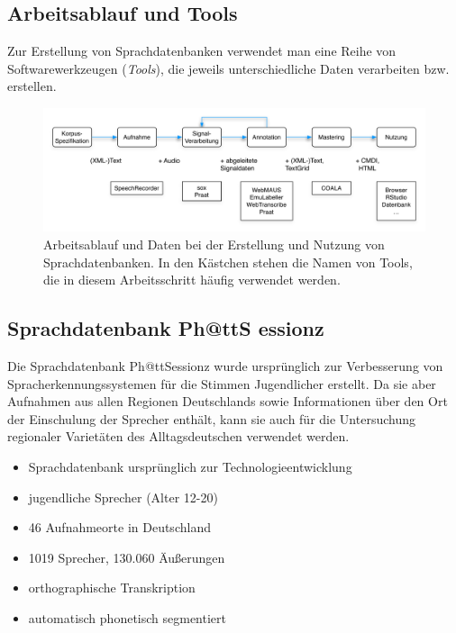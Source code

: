 \documentclass[11pt]{book}
\begin{document}
\subsection*{Arbeitsablauf und Tools}
Zur Erstellung von Sprachdatenbanken verwendet man eine Reihe von Softwarewerkzeugen ({\em Tools}), die jeweils unterschiedliche Daten verarbeiten bzw. erstellen.

\begin{figure}[htbp]
\begin{center}
\includegraphics[width=1\textwidth]{grafiken/sprachdatenbanken/workflow-de-2}
\caption{Arbeitsablauf und Daten bei der Erstellung und Nutzung von Sprachdatenbanken. In den Kästchen stehen die Namen von Tools, die in diesem Arbeitsschritt häufig verwendet werden.}
\label{fig_sdb_arbeitsablauf}
\end{center}
\end{figure}

\subsection*{Sprachdatenbank Ph@ttS
essionz}
Die Sprachdatenbank Ph@ttSessionz wurde ursprünglich zur Verbesserung von Spracherkennungssystemen für die Stimmen Jugendlicher erstellt. Da sie aber Aufnahmen aus allen Regionen Deutschlands sowie Informationen über den Ort der Einschulung der Sprecher enthält, kann sie auch für die Untersuchung regionaler Varietäten des Alltagsdeutschen verwendet werden.

\begin{itemize}
\item{Sprachdatenbank ursprünglich zur Technologieentwicklung}
\item{jugendliche Sprecher (Alter 12-20)}
\item{46 Aufnahmeorte in Deutschland}
\item{1019 Sprecher, 130.060 Äußerungen}
\item{orthographische Transkription}
\item{automatisch phonetisch segmentiert}
\end{itemize}
\end{document}

